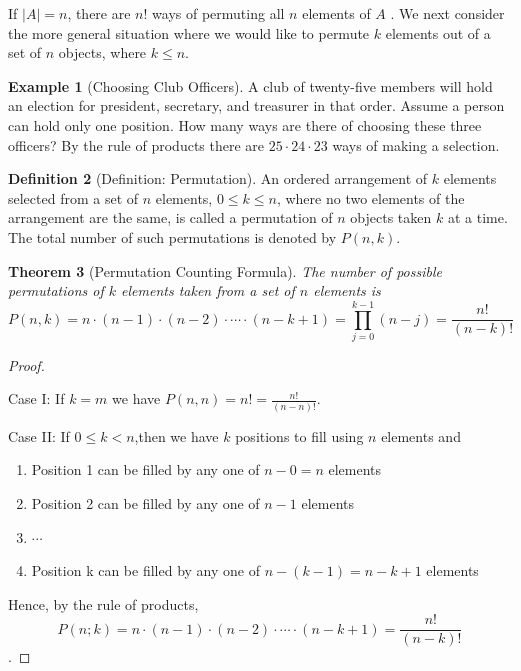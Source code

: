 \documentclass[10pt,]{book}
\theoremstyle{plain}
\newtheorem{theorem}{Theorem}[section]
\theoremstyle{definition}
\newtheorem{definition}[theorem]{Definition}
\newtheorem{example}[theorem]{Example}
\begin{document}
 If \(\lvert A \rvert = n \), there are \(n!\) ways of permuting all \(n\)  elements of \(A\) . We next consider the more general situation where we would like to permute \(k\) elements  out of a set of \(n\)  objects, where \( k \leq n\).
%
\begin{example}[Choosing Club Officers]\label{choosing-club-officers}
A club of twenty-five members will hold an election for president, secretary, and treasurer in that order. Assume a person can hold only one position. How many ways are there of choosing these three officers? By the rule of products there are \(25 \cdot 24 \cdot 23\) ways of making a selection.\end{example}
\begin{definition}[Definition: Permutation]\label{permutation}
 An ordered arrangement of \(k\) elements selected from a set of \(n\) elements, \(0 \leq k \leq  n\), where no two elements of the arrangement are the same, is called a permutation of \(n\) objects taken \(k\) at a time. The total number of such permutations is denoted by \(P(n, k)\).
\end{definition}
\begin{theorem}[Permutation Counting Formula]\label{permutations-counting-formula}
 The number of possible permutations of \(k\)  elements taken from a set of \(n\)  elements is
 \[P(n,k)=n \cdot (n-1) \cdot (n-2) \cdot  \cdots  \cdot (n-k+1) = \prod_{j=0}^{k-1} (n-j) = \frac{n!}{(n-k)!} \]\end{theorem}
\begin{proof}\hypertarget{proof-2}{}
  Case I: If \(k = m\) we have \(P(n,n)=n!=\frac{n!}{(n-n)!}\). %
\par
 Case II: If \(0 \leq  k < n\),then we have \(k\)  positions to fill using \(n\) elements and
\leavevmode%
\begin{enumerate}
\item\hypertarget{li-206}{}
 Position 1 can be filled by any one of \(n-0=n\)  elements
\item\hypertarget{li-207}{}
 Position 2 can be filled by any one of \(n-1\)  elements
\item\hypertarget{li-208}{}
 \( \cdots \)
\item\hypertarget{li-209}{}
 Position k can be filled by any one of \(n-(k-1)=n-k+1\)  elements
\end{enumerate}

%
\par
Hence, by the rule of products, \[P(n;k) = n \cdot(n - 1) \cdot (n - 2) \cdot \cdots \cdot (n - k + 1) = \frac{n!}{(n-k)!}\]. %
\end{proof}
\par
\end{document}

